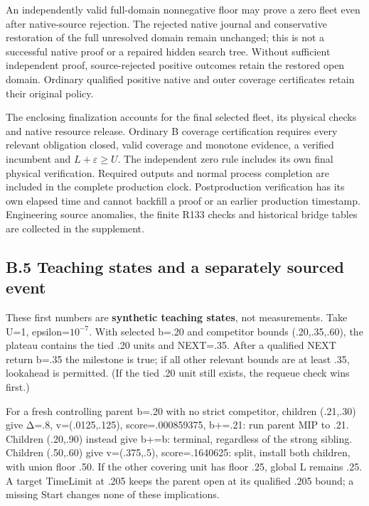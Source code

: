 \documentclass[
  american,
  11pt,
]{article}
\newcounter{none} %
\begin{document}
An independently valid full-domain nonnegative floor may prove a zero
fleet even after native-source rejection. The rejected native journal
and conservative restoration of the full unresolved domain remain
unchanged; this is not a successful native proof or a repaired hidden
search tree. Without sufficient independent proof, source-rejected
positive outcomes retain the restored open domain. Ordinary qualified
positive native and outer coverage certificates retain their original
policy.

The enclosing finalization accounts for the final selected fleet, its
physical checks and native resource release. Ordinary B coverage
certification requires every relevant obligation closed, valid coverage
and monotone evidence, a verified incumbent and \(L+\varepsilon\ge U\).
The independent zero rule includes its own final physical verification.
Required outputs and normal process completion are included in the
complete production clock. Postproduction verification has its own
elapsed time and cannot backfill a proof or an earlier production
timestamp. Engineering source anomalies, the finite R133 checks and
historical bridge tables are collected in the supplement.

\subsection{B.5 Teaching states and a separately sourced
event}\label{b.5-teaching-states-and-a-separately-sourced-event}

These first numbers are \textbf{synthetic teaching states}, not
measurements. Take U=1, epsilon=\(10^{-7}\). With selected b=.20 and
competitor bounds (.20,.35,.60), the plateau contains the tied .20 units
and NEXT=.35. After a qualified NEXT return b=.35 the milestone is true;
if all other relevant bounds are at least .35, lookahead is permitted.
(If the tied .20 unit still exists, the requeue check wins first.)

For a fresh controlling parent b=.20 with no strict competitor, children
(.21,.30) give Δ=.8, v=(.0125,.125), score=.000859375, b+=.21: run
parent MIP to .21. Children (.20,.90) instead give b+=b: terminal,
regardless of the strong sibling. Children (.50,.60) give v=(.375,.5),
score=.1640625: split, install both children, with union floor .50. If
the other covering unit has floor .25, global L remains .25. A target
TimeLimit at .205 keeps the parent open at its qualified .205 bound; a
missing Start changes none of these implications.
\end{document}

